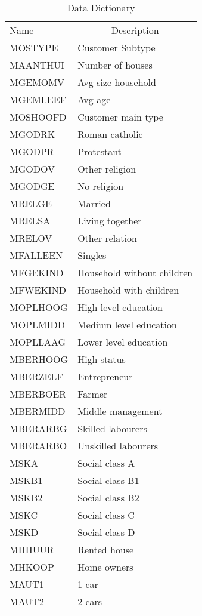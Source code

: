 \documentclass[man]{apa6}
\makeatletter
\newcommand\LastLTentrywidth{1em}
\newlength\longtablewidth
\newcommand{\getlongtablewidth}{\begingroup \ifcsname LT@\roman{LT@tables}\endcsname \global\longtablewidth=0pt \renewcommand{\LT@entry}[2]{\global\advance\longtablewidth by ##2\relax\gdef\LastLTentrywidth{##2}}\@nameuse{LT@\roman{LT@tables}} \fi \endgroup}
\makeatother
\begin{document}
\begin{center}
\begin{ThreePartTable}
\begin{longtable}{ll}\noalign{\getlongtablewidth\global\LTcapwidth=\longtablewidth}
\caption{\label{tab:unnamed-chunk-3}Data Dictionary}\\
\toprule
Name & \multicolumn{1}{c}{Description}\\
\midrule
MOSTYPE & Customer Subtype\\
MAANTHUI & Number of houses\\
MGEMOMV & Avg size household\\
MGEMLEEF & Avg age\\
MOSHOOFD & Customer main type\\
MGODRK & Roman catholic\\
MGODPR & Protestant\\
MGODOV & Other religion\\
MGODGE & No religion\\
MRELGE & Married\\
MRELSA & Living together\\
MRELOV & Other relation\\
MFALLEEN & Singles\\
MFGEKIND & Household without children\\
MFWEKIND & Household with children\\
MOPLHOOG & High level education\\
MOPLMIDD & Medium level education\\
MOPLLAAG & Lower level education\\
MBERHOOG & High status\\
MBERZELF & Entrepreneur\\
MBERBOER & Farmer\\
MBERMIDD & Middle management\\
MBERARBG & Skilled labourers\\
MBERARBO & Unskilled labourers\\
MSKA & Social class A\\
MSKB1 & Social class B1\\
MSKB2 & Social class B2\\
MSKC & Social class C\\
MSKD & Social class D\\
MHHUUR & Rented house\\
MHKOOP & Home owners\\
MAUT1 & 1 car\\
MAUT2 & 2 cars\\

\end{longtable}
\end{ThreePartTable}
\end{center}
\end{document}
